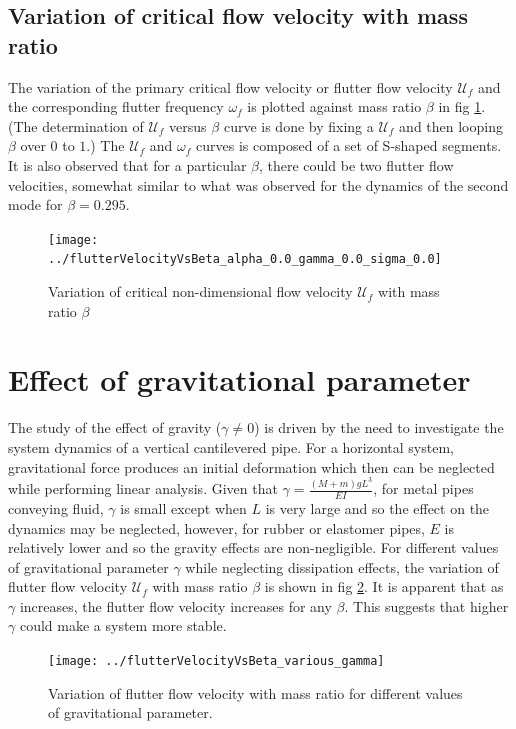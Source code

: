 \documentclass[12pt]{report}
\begin{document}
\cleardoublepage
\subsection{Variation of critical flow velocity with mass ratio}
The variation of the primary critical flow velocity or flutter flow velocity $\mathcal{U}_f$ and the corresponding flutter frequency $\omega_f$ is plotted against mass ratio $\beta$ in fig \ref{fig:criticalvelocityvsbeta}. (The determination of $\mathcal{U}_f$ versus $\beta$ curve is done by fixing a $\mathcal{U}_f$ and then looping $\beta$ over $0$ to $1$.) The $\mathcal{U}_f$ and $\omega_f$ curves is composed of a set of S-shaped segments. It is also observed that for a particular $\beta$, there could be two flutter flow velocities, somewhat similar to what was observed for the dynamics of the second mode for $\beta = 0.295$. 

\begin{figure}[h!]
	\centering
	\texttt{[image: ../flutterVelocityVsBeta\_alpha\_0.0\_gamma\_0.0\_sigma\_0.0]}
	\caption{Variation of critical non-dimensional flow velocity $\mathcal{U}_{f}$ with mass ratio $\beta$}
	\label{fig:criticalvelocityvsbeta}
\end{figure}

\cleardoublepage
\section{Effect of gravitational parameter}
The study of the effect of gravity ($\gamma \neq 0$) is driven by the need to investigate the system dynamics of a vertical cantilevered pipe. For a horizontal system, gravitational force produces an initial deformation which then can be neglected while performing linear analysis. Given that $\gamma = \frac{(M + m)gL^3}{EI}$, for metal pipes conveying fluid, $\gamma$ is small except when $L$ is very large and so the effect on the dynamics may be neglected, however, for rubber or elastomer pipes, $E$ is relatively lower and so the gravity effects are non-negligible. For different values of gravitational parameter $\gamma$ while neglecting dissipation effects, the variation of flutter flow velocity $\mathcal{U}_f$ with mass ratio $\beta$ is shown in fig \ref{fig:flutter-velocity-vs-beta-various-gamma}. It is apparent that as $\gamma$ increases, the flutter flow velocity increases for any $\beta$. This suggests that higher $\gamma$ could make a system more stable.

\begin{figure}[h!]
	\centering
	\texttt{[image: ../flutterVelocityVsBeta\_various\_gamma]}
	\caption{Variation of flutter flow velocity with mass ratio for different values of gravitational parameter.}
	\label{fig:flutter-velocity-vs-beta-various-gamma}
\end{figure}
\end{document}
